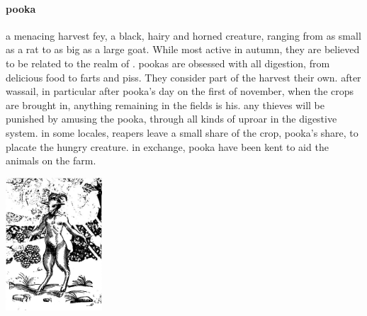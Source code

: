 \paragraph{pooka} a menacing harvest fey, a black, hairy and horned creature, ranging from as small as a rat to as big as a large goat. While most active in autumn, they are believed to be related to the realm of . pookas are obsessed with all digestion, from delicious food to farts and piss. They consider part of the harvest their own. after wassail, in particular after pooka's day on the first of november, when the crops are brought in, anything remaining in the fields is his. any thieves will be punished by amusing the pooka, through all kinds of uproar in the digestive system. in some locales, reapers leave a small share of the crop, pooka's share, to placate the hungry creature. in exchange, pooka have been kent to aid the animals on the farm. \begin{center}\includegraphics[width=3.6cm]{encyclopedia/pooka.png}\end{center}
